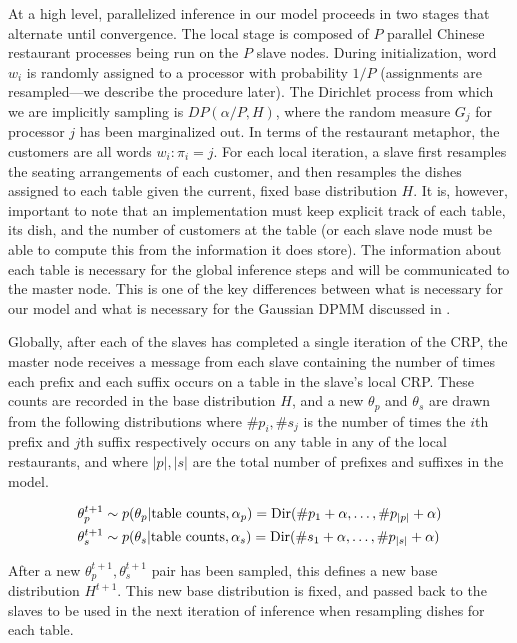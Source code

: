 At a high level, parallelized inference in our model proceeds in two
stages that alternate until convergence. The local stage is composed
of $P$ parallel Chinese restaurant processes being run on the $P$
slave nodes. During initialization, word $w_i$ is randomly assigned to
a processor with probability $1/P$ (assignments are resampled---we
describe the procedure later). The Dirichlet process from which we are
implicitly sampling is $DP(\alpha/P, H)$, where the random measure
$G_j$ for processor $j$ has been marginalized out. In terms of the
restaurant metaphor, the customers are all words $w_i : {\pi_i =
  j}$. For each local iteration, a slave first resamples the seating
arrangements of each customer, and then resamples the dishes assigned
to each table given the current, fixed base distribution $H$. It is,
however, important to note that an implementation must keep explicit
track of each table, its dish, and the number of customers at the
table (or each slave node must be able to compute this from the
information it does store). The information about each table is
necessary for the global inference steps and will be communicated to
the master node. This is one of the key differences between what is
necessary for our model and what is necessary for the Gaussian DPMM
discussed in \cite{williamson2013}.

Globally, after each of the slaves has completed a single iteration of
the CRP, the master node receives a message from each slave containing
the number of times each prefix and each suffix occurs on a table in
the slave's local CRP. These counts are recorded in the base
distribution $H$, and a new $\theta_p$ and $\theta_s$ are drawn from
the following distributions where $\#p_i, \#s_j$ is the number of times
the $i$th prefix and $j$th suffix respectively occurs on any table in
any of the local restaurants, and where $|p|, |s|$ are the total
number of prefixes and suffixes in the model.

\begin{align}
  \theta_p^{t+1} & \sim p(\theta_p | \text{table counts}, \alpha_p) = \mathrm{Dir}(\#p_1 + \alpha, \ldots, \#p_{|p|} + \alpha) \\
  \theta_s^{t+1} & \sim p(\theta_s | \text{table counts}, \alpha_s) = \mathrm{Dir}(\#s_1 + \alpha, \ldots, \#p_{|s|} + \alpha)
\end{align}

After a new $\theta_p^{t+1}, \theta_s^{t+1}$ pair has been sampled,
this defines a new base distribution $H^{t+1}$. This new base
distribution is fixed, and passed back to the slaves to be used in the
next iteration of inference when resampling dishes for each table.

